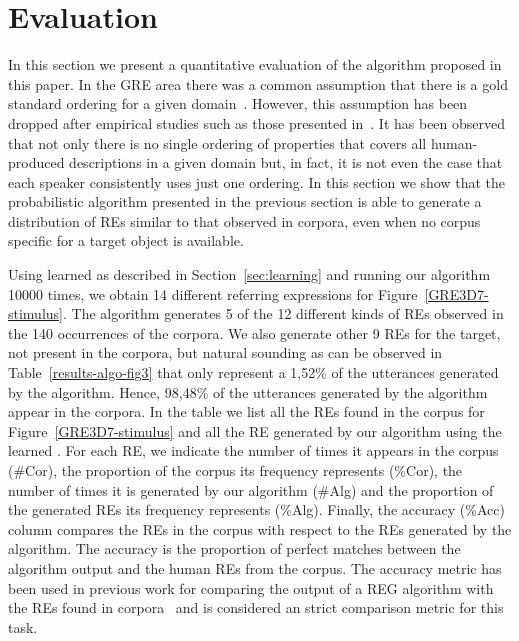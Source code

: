 \section{Evaluation}\label{sec:evaluation}

In this section we present a quantitative evaluation of the algorithm proposed in this paper. In the GRE area there was a common assumption that there is a gold standard ordering for a given domain~\cite{Dale1995}. However, this assumption has been dropped after empirical studies such as those presented in~\cite{arec2:2008:Areces,viet:gene11}. It has been observed that not only there is no single ordering of properties that covers all human-produced descriptions in a given domain but, in fact, it is not even the case that each speaker consistently uses just one ordering. In this section we show that the probabilistic algorithm presented in the previous section is able to generate a distribution of REs similar to that observed in corpora, even when no corpus specific for a target object is available. 

Using \puse learned as described in Section~\ref{sec:learning} and running our algorithm 10000 times, we obtain 14 different referring expressions for Figure~\ref{GRE3D7-stimulus}. The algorithm generates 5 of the 12 different kinds of REs observed in the 140 occurrences of the corpora. We also generate other 9 REs for the target, not present in the corpora, but natural sounding as can be observed in Table~\ref{results-algo-fig3} that only represent a 1,52\% of the utterances generated by the algorithm. Hence, 98,48\% of the utterances generated by the algorithm appear in the corpora. In the table we list all the REs found in the corpus for Figure~\ref{GRE3D7-stimulus} and all the RE generated by our algorithm using the learned \puse. For each RE, we indicate the number of times it appears in the corpus (\#Cor), the proportion of the corpus its frequency represents (\%Cor), the number of times it is generated by our algorithm (\#Alg) and the proportion of the generated REs its frequency represents (\%Alg). Finally, the accuracy (\%Acc) column compares the REs in the corpus with respect to the REs generated by the algorithm. The accuracy is the proportion of perfect matches between the algorithm output and the human REs from the corpus. The accuracy metric has been used in previous work for comparing the output of a REG algorithm with the REs found in corpora~\cite{sluis07:eval,viet:gene11} and is considered an strict comparison metric for this task. 

